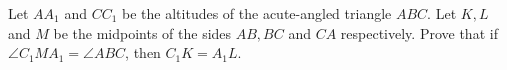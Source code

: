 Let $AA_1$ and $CC_1$ be the altitudes of the acute-angled  triangle $ABC$. Let $K,L$ and $M$ be the midpoints of the sides $AB,BC$ and $CA$ respectively. Prove that if  $\angle C_1MA_1 =\angle ABC$, then $C_1 K = A_1L$.
